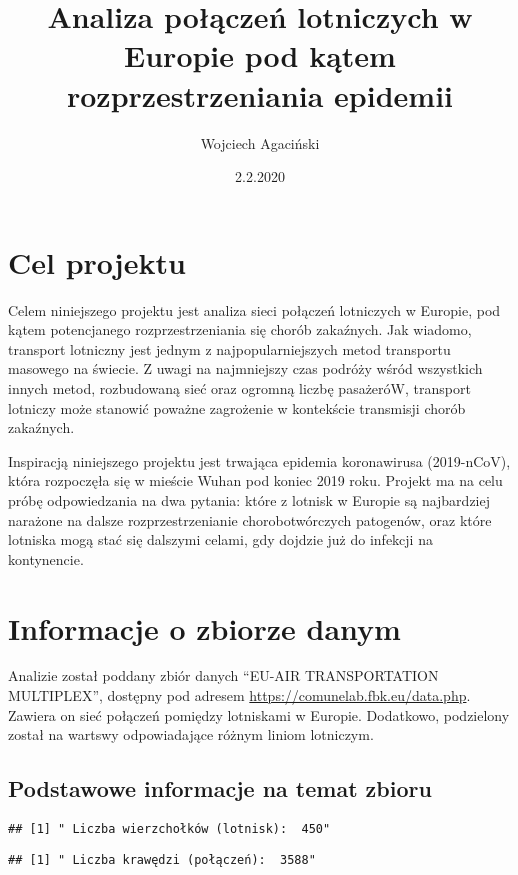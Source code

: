 \documentclass[
]{article}
\title{Analiza połączeń lotniczych w Europie pod kątem rozprzestrzeniania
epidemii}
\author{Wojciech Agaciński}
\date{2.2.2020}
\begin{document}
\maketitle

\hypertarget{cel-projektu}{%
\section{Cel projektu}\label{cel-projektu}}

Celem niniejszego projektu jest analiza sieci połączeń lotniczych w
Europie, pod kątem potencjanego rozprzestrzeniania się chorób zakaźnych.
Jak wiadomo, transport lotniczny jest jednym z najpopularniejszych metod
transportu masowego na świecie. Z uwagi na najmniejszy czas podróży
wśród wszystkich innych metod, rozbudowaną sieć oraz ogromną liczbę
pasażeróW, transport lotniczy może stanowić poważne zagrożenie w
kontekście transmisji chorób zakaźnych.

Inspiracją niniejszego projektu jest trwająca epidemia koronawirusa
(2019-nCoV), która rozpoczęła się w mieście Wuhan pod koniec 2019 roku.
Projekt ma na celu próbę odpowiedzania na dwa pytania: które z lotnisk w
Europie są najbardziej narażone na dalsze rozprzestrzenianie
chorobotwórczych patogenów, oraz które lotniska mogą stać się dalszymi
celami, gdy dojdzie już do infekcji na kontynencie.

\hypertarget{informacje-o-zbiorze-danym}{%
\section{Informacje o zbiorze danym}\label{informacje-o-zbiorze-danym}}

Analizie został poddany zbiór danych ``EU-AIR TRANSPORTATION
MULTIPLEX'', dostępny pod adresem
\url{https://comunelab.fbk.eu/data.php}. Zawiera on sieć połączeń
pomiędzy lotniskami w Europie. Dodatkowo, podzielony został na wartswy
odpowiadające różnym liniom lotniczym.

\hypertarget{podstawowe-informacje-na-temat-zbioru}{%
\subsection{Podstawowe informacje na temat
zbioru}\label{podstawowe-informacje-na-temat-zbioru}}

\begin{verbatim}
## [1] " Liczba wierzchołków (lotnisk):  450"
\end{verbatim}

\begin{verbatim}
## [1] " Liczba krawędzi (połączeń):  3588"
\end{verbatim}
\end{document}
